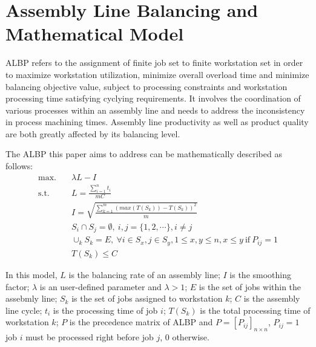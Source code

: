 \section{Assembly Line Balancing and Mathematical Model}
ALBP refers to the assignment of finite job set to finite workstation set in order to maximize workstation utilization, minimize overall overload time and minimize balancing objective value, subject to processing constraints and workstation processing time satisfying cyclying requirements.
It involves the coordination of various processes within an assembly line and needs to address the inconsistency in process machining times.
Assembly line productivity as well as product quality are both greatly affected by its balancing level.

The ALBP this paper aims to address can be mathematically described as follows:
\begin{align}
	\text{max.} \quad & \lambda L - I \\
	\text{s.t.} \quad & L = \frac{\sum_{i=1}^{n} t_i}{mC} \\
	& I = \sqrt{\frac{\sum_{k=1}^{m} (max(T(S_k)) - T(S_k))^2}{m}} \\
	& S_i \cap S_j = \emptyset, \ i, j = \{1, 2, \cdots\}, i \neq j \\
	& \cup_k S_k = E, \ \forall i \in S_x, j \in S_y, 1 \leq x, y \leq n, x \leq y \  \text{if} \  P_{ij} = 1 \\
	& T(S_k) \leq C 
\end{align}

In this model, $L$ is the balancing rate of an assembly line; $I$ is the smoothing factor; $\lambda$ is an user-defined parameter and $\lambda > 1$; $E$ is the set of jobs within the assebmly line; $S_k$ is the set of jobs assigned to workstation $k$; $C$ is the assembly line cycle; $t_i$ is the processing time of job $i$; $T(S_k)$ is the total processing time of workstation $k$; $P$ is the precedence matrix of ALBP and $P = [P_{ij}]_{n\times n}$, $P_{ij} = 1$ job $i$ must be processed right before job $j$, 0 otherwise.